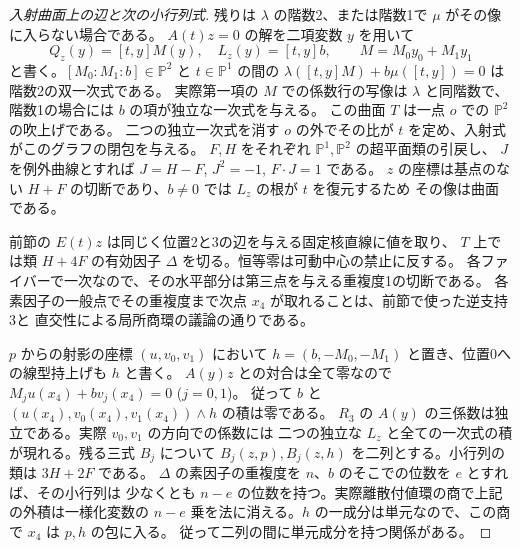 \begin{proof}[入射曲面上の辺と次の小行列式]
残りは $\lambda$ の階数2、または階数1で $\mu$ がその像に入らない場合である。
$A(t)z=0$ の解を二項変数 $y$ を用いて
\[
      Q_z(y)=[t,y]M(y),\quad L_z(y)=[t,y]b,\qquad M=M_0 y_0+M_1y_1
\]
と書く。$[M_0:M_1:b]\in\mathbb P^2$ と $t\in\mathbb P^1$ の間の
$\lambda([t,y]M)+b\mu([t,y])=0$ は階数2の双一次式である。
実際第一項の $M$ での係数行の写像は $\lambda$ と同階数で、階数1の場合には $b$ の項が独立な一次式を与える。
この曲面 $T$ は一点 $o$ での $\mathbb P^2$ の吹上げである。
二つの独立一次式を消す $o$ の外でその比が $t$ を定め、入射式がこのグラフの閉包を与える。
$F,H$ をそれぞれ $\mathbb P^1,\mathbb P^2$ の超平面類の引戻し、
$J$ を例外曲線とすれば $J=H-F$, $J^2=-1$, $F\cdot J=1$ である。
$z$ の座標は基点のない $H+F$ の切断であり、$b\ne0$ では $L_z$ の根が $t$ を復元するため
その像は曲面である。

前節の $E(t)z$ は同じく位置2と3の辺を与える固定核直線に値を取り、
$T$ 上では類 $H+4F$ の有効因子 $\Delta$ を切る。恒等零は可動中心の禁止に反する。
各ファイバーで一次なので、その水平部分は第三点を与える重複度1の切断である。
各素因子の一般点でその重複度まで次点 $x_4$ が取れることは、前節で使った逆支持3と
直交性による局所商環の議論の通りである。

$p$ からの射影の座標 $(u,v_0,v_1)$ において $h=(b,-M_0,-M_1)$ と置き、位置0への線型持上げも $h$ と書く。
$A(y)z$ との対合は全て零なので $M_j u(x_4)+b v_j(x_4)=0$ ($j=0,1$)。
従って $b$ と $(u(x_4),v_0(x_4),v_1(x_4))\wedge h$ の積は零である。
$R_3$ の $A(y)$ の三係数は独立である。実際 $v_0,v_1$ の方向での係数には
二つの独立な $L_z$ と全ての一次式の積が現れる。残る三式 $B_j$ について
$B_j(z,p),B_j(z,h)$ を二列とする。小行列の類は $3H+2F$ である。
$\Delta$ の素因子の重複度を $n$、$b$ のそこでの位数を $e$ とすれば、その小行列は
少なくとも $n-e$ の位数を持つ。実際離散付値環の商で上記の外積は一様化変数の
$n-e$ 乗を法に消える。$h$ の一成分は単元なので、この商で $x_4$ は $p,h$ の包に入る。
従って二列の間に単元成分を持つ関係がある。
\end{proof}
